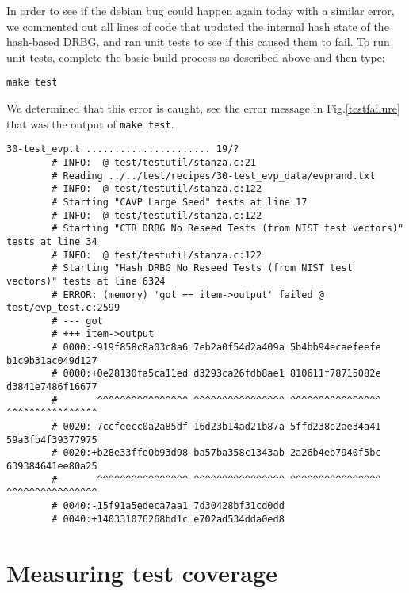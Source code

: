 \documentclass[conference]{IEEEtran}
\begin{document}
In order to see if the debian bug could happen again today with a
similar error, we commented out all lines of code that updated the
internal hash state of the hash-based DRBG, and ran unit tests to see
if this caused them to fail. To run unit tests, complete the basic
build process as described above and then type:

\begin{verbatim}
make test
\end{verbatim}

We determined that this error is caught, see the error message in
Fig.\ref{testfailure} that was the output of \verb|make test|.

\begin{figure*}[!t]

\centering
\begin{verbatim}
30-test_evp.t ...................... 19/? 
        # INFO:  @ test/testutil/stanza.c:21
        # Reading ../../test/recipes/30-test_evp_data/evprand.txt
        # INFO:  @ test/testutil/stanza.c:122
        # Starting "CAVP Large Seed" tests at line 17
        # INFO:  @ test/testutil/stanza.c:122
        # Starting "CTR DRBG No Reseed Tests (from NIST test vectors)" tests at line 34
        # INFO:  @ test/testutil/stanza.c:122
        # Starting "Hash DRBG No Reseed Tests (from NIST test vectors)" tests at line 6324
        # ERROR: (memory) 'got == item->output' failed @ test/evp_test.c:2599
        # --- got
        # +++ item->output
        # 0000:-919f858c8a03c8a6 7eb2a0f54d2a409a 5b4bb94ecaefeefe b1c9b31ac049d127
        # 0000:+0e28130fa5ca11ed d3293ca26fdb8ae1 810611f78715082e d3841e7486f16677
        #       ^^^^^^^^^^^^^^^^ ^^^^^^^^^^^^^^^^ ^^^^^^^^^^^^^^^^ ^^^^^^^^^^^^^^^^
        # 0020:-7ccfeecc0a2a85df 16d23b14ad21b87a 5ffd238e2ae34a41 59a3fb4f39377975
        # 0020:+b28e33ffe0b93d98 ba57ba358c1343ab 2a26b4eb7940f5bc 639384641ee80a25
        #       ^^^^^^^^^^^^^^^^ ^^^^^^^^^^^^^^^^ ^^^^^^^^^^^^^^^^ ^^^^^^^^^^^^^^^^
        # 0040:-15f91a5edeca7aa1 7d30428bf31cd0dd
        # 0040:+140331076268bd1c e702ad534dda0ed8
\end{verbatim}
\caption{A test failure}
\label{testfailure}  
\end{figure*}

\section{Measuring test coverage}
\end{document}
